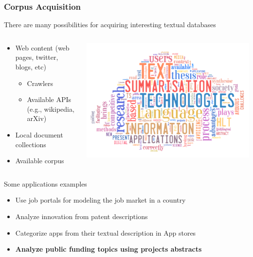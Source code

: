 \documentclass{beamer}
\begin{document}
\begin{frame}

    \frametitle{Corpus Acquisition}

	There are many possibilities for acquiring interesting textual databases

	\begin{columns}
	
	\begin{column}{.5\textwidth}
		\begin{itemize}
			
			\item Web content (web pages, twitter, blogs, etc)
			\begin{itemize}
				\item Crawlers
				\item Available APIs (e.g., wikipedia, arXiv)
			\end{itemize}
			\item Local document collections
			\item Available corpus	
			
		\end{itemize}
	\end{column}
	
	\begin{column}{.5\textwidth}
		\vspace{.2cm}			\centerline{\includegraphics[width=\textwidth]{./figs/NLPTM_wordcloud2.png}}
	\end{column}

	\end{columns}
	
Some applications examples
\begin{itemize}
\item Use job portals for modeling the job market in a country
\item Analyze innovation from patent descriptions
\item Categorize apps from their textual description in App stores
\item {\bf{Analyze public funding topics using projects abstracts}}
\end{itemize}

\end{frame}
\end{document}
